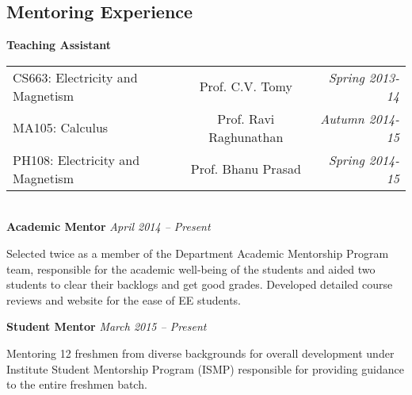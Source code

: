 \documentclass[margin,line]{res}
\newenvironment{list1}{
  \begin{list}{\ding{113}}{%
      \setlength{\itemsep}{0in}
      \setlength{\parsep}{0in} \setlength{\parskip}{0in}
      \setlength{\topsep}{0in} \setlength{\partopsep}{0in} 
      \setlength{\leftmargin}{0.17in}}}{\end{list}}
\begin{document}
\begin{resume}
\section{\sc Mentoring Experience}
\textbf{Teaching Assistant}\\
\begin{tabular}{@{}p{2.77in}p{5in}p{3in}}
\strut\hspace{0.5cm}CS663: Electricity and Magnetism & \multicolumn{1}{c}{  Prof. C.V. Tomy  } & \multicolumn{1}{r}{\strut\hspace{1cm}\textit{Spring 2013-14}}\\
\strut\hspace{0.5cm}MA105: Calculus & \multicolumn{1}{c}{  Prof. Ravi Raghunathan  } & \multicolumn{1}{r}{\strut\hspace{1cm}\textit{Autumn 2014-15}}\\
\strut\hspace{0.5cm}PH108: Electricity and Magnetism & \multicolumn{1}{c}{  Prof. Bhanu Prasad  } & \multicolumn{1}{r}{\strut\hspace{1cm}\textit{Spring 2014-15}}\\
\end{tabular}\\
\textbf{Academic Mentor} \hfill \textit{April 2014 -- Present}\\
\vspace*{-.15in}
\begin{list1}
\item[]Selected twice as a member of the Department Academic Mentorship Program team, responsible for the academic well-being of the students and aided two students to clear their backlogs and get good grades. Developed detailed course reviews and website for the ease of EE students.
\end{list1}

\vspace*{-0.1in}

\textbf{Student Mentor} \hfill \textit{March 2015 -- Present}\\
\vspace*{-.15in}
\begin{list1}
\item[]Mentoring 12 freshmen from diverse backgrounds for overall development under Institute Student Mentorship Program (ISMP) responsible for providing guidance to the entire freshmen batch. 
\end{list1}

\vspace*{-0.1in}


\end{resume}
\end{document}
